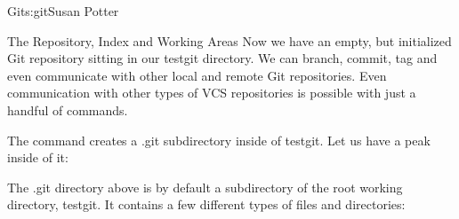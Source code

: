 \begin{aosachapter}{Git}{s:git}{Susan Potter}
\begin{aosasect1}{The Repository, Index and Working Areas}
Now we have an empty, but initialized Git repository sitting in our testgit
directory. We can branch, commit, tag and even communicate with other local
and remote Git repositories. Even communication with other types of VCS
repositories is possible with just a handful of  commands.

The  command creates a .git subdirectory inside of testgit.
Let us have a peak inside of it:
\begin{aosaitemize}
  \item {}\newline
\end{aosaitemize}

The .git directory above is by default a subdirectory of the root working
directory, testgit. It contains a few different types of files and
directories:


\end{aosasect1}
\end{aosachapter}
